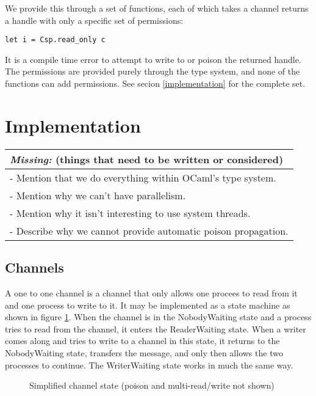 \documentclass[a4paper,12pt]{article}
\newcommand{\missing}[1]{
  \begin{tabular}{|p{11cm}|}
    \hline
    \emph{Missing:} {\scriptsize (things that need to be written or considered)} \\
    \hline
    #1
    \hline
  \end{tabular}
}
\begin{document}
We provide this through a set of functions, each of which takes a channel
returns a handle with only a specific set of permissions:

\begin{verbatim}
let i = Csp.read_only c
\end{verbatim}

It is a compile time error to attempt to write to or poison the returned handle.
The permissions are provided purely through the type system, and none of the
functions can add permissions. See secion \ref{implementation} for the complete
set.

\section{Implementation}
\missing{
- Mention that we do everything within OCaml's type system.\\
- Mention why we can't have parallelism.\\
- Mention why it isn't interesting to use system threads.\\
- Describe why we cannot provide automatic poison propagation.\\
}
\label{implementation}


\subsection{Channels}
A one to one channel is a channel that only allows one procees to read from it and one process 
to write to it. It may be implemented as a state machine as shown in figure \ref{channel-state}.
When the channel is in the NobodyWaiting state and a process tries to read from the channel,
it enters the ReaderWaiting state. When a writer comes along and tries to write to a channel
in this state, it returns to the NobodyWaiting state, transfers the message, and only then
allows the two processes to continue. The WriterWaiting state works in much the same way.

\begin{figure}[h]
\centering
\caption{Simplified channel state (poison and multi-read/write not shown)}
\label{channel-state}
\end{figure}
\end{document}
